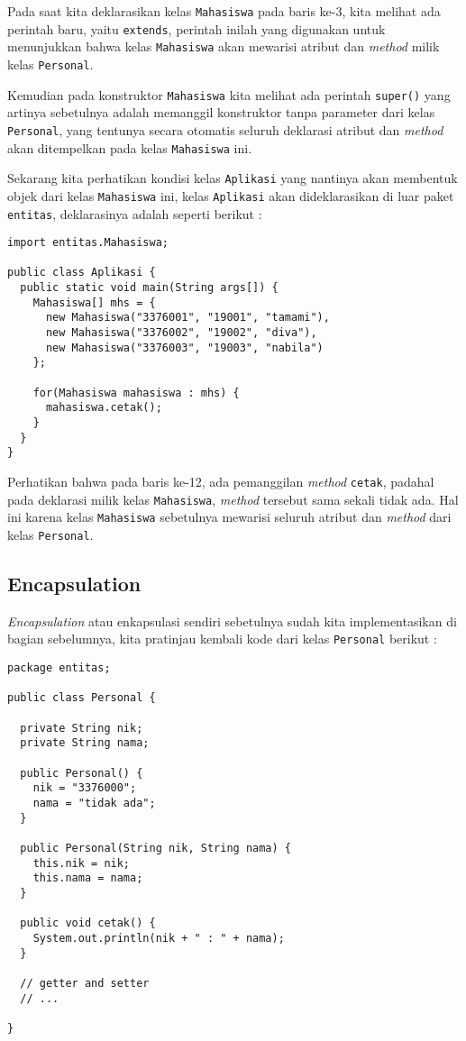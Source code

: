 Pada saat kita deklarasikan kelas \texttt{Mahasiswa} pada baris ke-3, kita melihat ada perintah baru, yaitu \texttt{extends}, perintah inilah yang digunakan untuk menunjukkan bahwa kelas \texttt{Mahasiswa} akan mewarisi atribut dan \textit{method} milik kelas \texttt{Personal}.

Kemudian pada konstruktor \texttt{Mahasiswa} kita melihat ada perintah \texttt{super()} yang artinya sebetulnya adalah memanggil konstruktor tanpa parameter dari kelas \texttt{Personal}, yang tentunya secara otomatis seluruh deklarasi atribut dan \textit{method} akan ditempelkan pada kelas \texttt{Mahasiswa} ini.

Sekarang kita perhatikan kondisi kelas \texttt{Aplikasi} yang nantinya akan membentuk objek dari kelas \texttt{Mahasiswa} ini, kelas \texttt{Aplikasi} akan dideklarasikan di luar paket \texttt{entitas}, deklarasinya adalah seperti berikut :

\begin{lstlisting}
import entitas.Mahasiswa;

public class Aplikasi {
  public static void main(String args[]) {
    Mahasiswa[] mhs = {
      new Mahasiswa("3376001", "19001", "tamami"),
      new Mahasiswa("3376002", "19002", "diva"),
      new Mahasiswa("3376003", "19003", "nabila")
    };

    for(Mahasiswa mahasiswa : mhs) {
      mahasiswa.cetak();
    }
  }
}
\end{lstlisting}

Perhatikan bahwa pada baris ke-12, ada pemanggilan \textit{method} \texttt{cetak}, padahal pada deklarasi milik kelas \texttt{Mahasiswa}, \textit{method} tersebut sama sekali tidak ada. Hal ini karena kelas \texttt{Mahasiswa} sebetulnya mewarisi seluruh atribut dan \textit{method} dari kelas \texttt{Personal}.

\subsection{Encapsulation}

\textit{Encapsulation} atau enkapsulasi sendiri sebetulnya sudah kita implementasikan di bagian sebelumnya, kita pratinjau kembali kode dari kelas \texttt{Personal} berikut :

\begin{lstlisting}
package entitas;

public class Personal {
  
  private String nik;
  private String nama;
  
  public Personal() {
    nik = "3376000";
    nama = "tidak ada";
  }  
  
  public Personal(String nik, String nama) {
    this.nik = nik;
    this.nama = nama;
  }
  
  public void cetak() {
    System.out.println(nik + " : " + nama);
  }
  
  // getter and setter
  // ...
  
}
\end{lstlisting}

